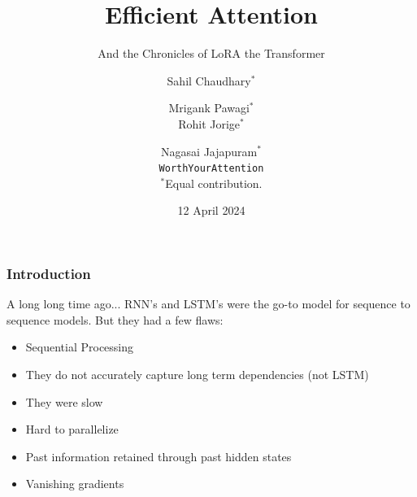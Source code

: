 \documentclass{beamer}
\title[Efficient Attention]
{Efficient Attention}
\subtitle{
    And the Chronicles of LoRA the Transformer
}
\author[Chaudhary, Pawagi, Jorige, Nagasai]
{
    Sahil Chaudhary$^*$ \and Mrigank Pawagi$^*$ \\ Rohit Jorige$^*$ \and Nagasai Jajapuram$^*$ \bigskip \\
    \texttt{WorthYourAttention}
    \\
    {\tiny $^*$Equal contribution.}
}
\institute[]
{Indian Institute of Science}
\date[12 April 2024]
{12 April 2024}
\begin{document}
\frame{\titlepage}

\begin{frame}
    \frametitle{Introduction}
    A long long time ago... RNN's and LSTM's were the go-to model for sequence to sequence models. But they had a few flaws:
    \begin{itemize}
        \item Sequential Processing
        \item They do not accurately capture long term dependencies (not LSTM)
        \item They were slow
        \item Hard to parallelize 
        \item Past information retained through past hidden states
        \item Vanishing gradients
    \end{itemize}
    \end{frame}
\end{document}
